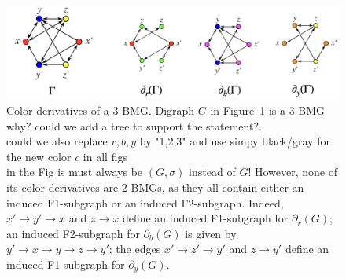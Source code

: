 \documentclass[final,3p,times]{elsarticle}
\newcommand{\TODO}[1]{\begingroup\color{red}#1\endgroup}
\begin{document}
\begin{figure}[ht]
  \centering
    \includegraphics[width=16cm]{figures/color_derivatives.png}
    \caption{Color derivatives of a 3-BMG.
    Digraph $G$ in Figure~\ref{fig:color_derivatives} is a 3-BMG
    \TODO{why? could we add a tree to support the statement?}.\\
    \TODO{could we also replace $r,b,y$ by "1,2,3" and use simpy black/gray
    for the new color $c$ in all figs}\\
    \TODO{in the Fig is must always be $(G,\sigma)$ instead of $G$!}
     However,
    none of its color derivatives are 2-BMGs, as they all contain either an
    induced F1-subgraph or an induced F2-subgraph. Indeed, $x'\rightarrow
    y'\rightarrow x$ and $z\rightarrow x$ define an induced F1-subgraph for
    $\partial_r(G)$; an induced F2-subgraph for $\partial_b(G)$ is
    given by $y'\rightarrow x\rightarrow y\rightarrow z\rightarrow y'$; the
    edges $x'\rightarrow z'\rightarrow y'$ and $z \rightarrow y'$ define an
    induced F1-subgraph for $\partial_y(G)$.
}
   \label{fig:color_derivatives}
\end{figure}
\end{document}
